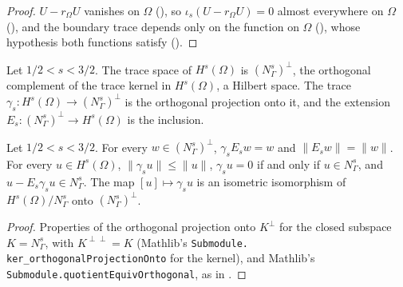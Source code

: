 \begin{proof}
\leanok
$U - r_\Omega U$ vanishes on $\Omega$ (), so
$\iota_s(U - r_\Omega U) = 0$ almost everywhere on $\Omega$ (),
and the boundary trace depends only on the function on $\Omega$
(), whose hypothesis both functions satisfy
().
\end{proof}

\begin{definition}
\label{def:trace-space}
\leanok
{}
Let $1/2 < s < 3/2$. The trace space of $H^s(\Omega)$ is $(N^s_\Gamma)^\perp$, the orthogonal
complement of the trace kernel in $H^s(\Omega)$, a Hilbert space. The trace
$\gamma_s : H^s(\Omega) \to (N^s_\Gamma)^\perp$ is the orthogonal projection onto it, and the
extension $E_s : (N^s_\Gamma)^\perp \to H^s(\Omega)$ is the inclusion.
\end{definition}

\begin{theorem}
\label{thm:trace-space-operators}
\leanok
{}
Let $1/2 < s < 3/2$. For every $w \in (N^s_\Gamma)^\perp$, $\gamma_s E_s w = w$ and
$\|E_s w\| = \|w\|$. For every $u \in H^s(\Omega)$, $\|\gamma_s u\| \leq \|u\|$, $\gamma_s u = 0$
if and only if $u \in N^s_\Gamma$, and $u - E_s \gamma_s u \in N^s_\Gamma$. The map
$[u] \mapsto \gamma_s u$ is an isometric isomorphism of $H^s(\Omega) / N^s_\Gamma$ onto
$(N^s_\Gamma)^\perp$.
\end{theorem}

\begin{proof}
\leanok
Properties of the orthogonal projection onto $K^\perp$ for the closed subspace $K = N^s_\Gamma$,
with $K^{\perp\perp} = K$ (Mathlib's \texttt{Submodule.\allowbreak
ker\_\allowbreak orthogonalProjectionOnto} for the kernel), and Mathlib's
\texttt{Submodule.\allowbreak quotientEquivOrthogonal}, as in
.
\end{proof}

